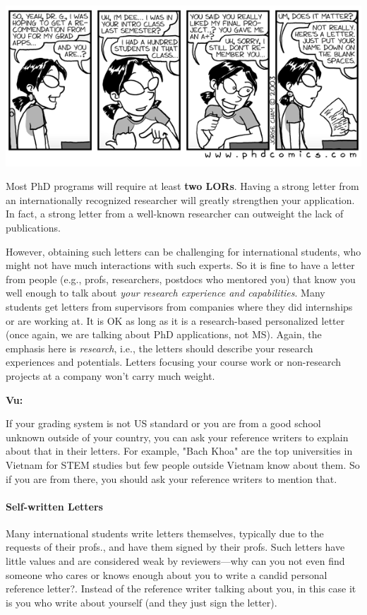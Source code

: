 \documentclass[oneside,11pt]{memoir}
\newenvironment{commentbox}[1][]{
  \small
  \begin{mybox}
    {\small \textbf{#1}}
  }{
  \end{mybox}
}
\begin{document}
\begin{center}
  \includegraphics[width=0.6\linewidth]{files/c6.png}
\end{center}


Most PhD programs will require at least \textbf{two LORs}. Having a strong letter from an internationally recognized researcher will greatly strengthen your application. In fact, a strong letter from a well-known researcher can outweight the lack of publications.


However, obtaining such letters
can be challenging for international students, who might not have much interactions with such experts. So it is fine to have a letter from people (e.g., profs, researchers, postdocs who mentored you) that know you well enough to talk about \emph{your research experience and capabilities}. Many students get letters from supervisors from companies where they did internships or are working at. It is OK as long as it is a research-based personalized letter (once again, we are talking about PhD applications, not MS). Again, the emphasis here is \emph{research}, i.e., the letters should describe your research experiences and potentials. Letters focusing your course work or non-research projects at a company won't carry much weight.


\begin{commentbox}[Vu:]
  If your grading system is not US standard or you are from a good school unknown outside of your country, you can ask your reference writers to explain about that in their letters.  For example, "Bach Khoa" are the top universities in Vietnam for STEM studies but few people outside Vietnam know about them.  So if you are from there, you should ask your reference writers to mention that.
\end{commentbox}

\paragraph{Self-written Letters} Many international students write letters themselves, typically due to the requests of their profs., and have them signed by their profs. Such letters have little values and are considered weak by reviewers---why can you not even find someone who cares or knows enough about you to write a candid personal reference letter?.  Instead of the reference writer talking about you, in this case it is you who write about yourself (and they just sign the letter).
\end{document}

